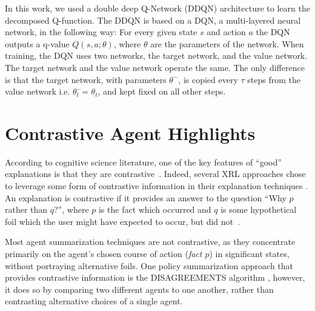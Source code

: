 \documentclass{ecai}
\begin{document}
In this work, we used a double deep Q-Network (DDQN) \cite{mnih2015human} architecture to learn the decomposed Q-function. The DDQN is based on a DQN, a multi-layered neural network, in the following way: For every given state $s$ and action $a$ the DQN outputs a q-value $Q(s,a;\theta)$, where $\theta$ are the parameters of the network. When training, the DQN uses two networks, the target network, and the value network. The target network and the value network operate the same. The only difference is that the target network, with parameters $\theta^-$, is copied every $\tau$ steps from the value network i.e. $\theta^-_t$= $\theta_t$, and kept fixed on all other steps.

\section{Contrastive Agent Highlights}
\label{sec:contrastive}
According to cognitive science literature, one of the key features of ``good'' explanations is that they are contrastive~\cite{miller2019explanation}. Indeed, several XRL approaches chose to leverage some form of contrastive information in their explanation techniques \cite{silva2021teaching,lin2020contrastive,van2018contrastive}. An explanation is contrastive if it provides an answer to the question ``Why $p$ rather than $q$?'', where $p$ is the fact which occurred and $q$ is some hypothetical foil which the user might have expected to occur, but did not~\cite{lipton1991seductive}.

Most agent summarization techniques are not contrastive, as they concentrate primarily on the agent's chosen course of action (\emph{fact $p$}) in significant states, without portraying alternative foils. One policy summarization approach that provides contrastive information is the DISAGREEMENTS algorithm \cite{amitai2021don}, however, it does so by comparing two different agents to one another, rather than contrasting alternative choices of a single agent.
\end{document}
